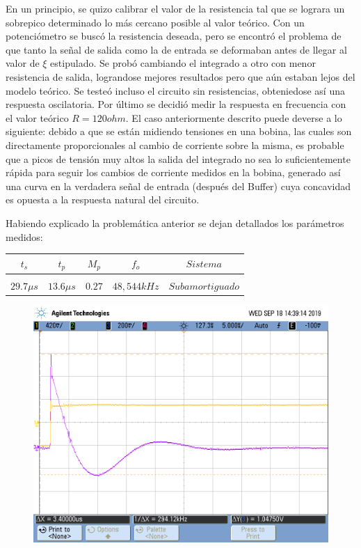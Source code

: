 En un principio, se quizo calibrar el valor de la resistencia tal que se lograra un sobrepico determinado lo más cercano posible al valor teórico. Con un potenciómetro se buscó la resistencia deseada, pero se encontró el problema de que tanto la señal de salida como la de entrada se deformaban antes de llegar al valor de $\xi$ estipulado. Se probó cambiando el integrado a otro con menor resistencia de salida, lograndose mejores resultados pero que aún estaban lejos del modelo teórico. Se testeó incluso el circuito sin resistencias, obteniedose así una respuesta oscilatoria. Por último se decidió medir la respuesta en frecuencia con el valor teórico $R = 120 ohm$. El caso anteriormente descrito puede deverse a lo siguiente: debido a que se están midiendo tensiones en una bobina, las cuales son directamente proporcionales al cambio de corriente sobre la misma, es probable que a picos de tensión muy altos la salida del integrado no sea lo suficientemente rápida para seguir los cambios de corriente medidos en la bobina, generado así una curva en la verdadera señal de entrada (después del Buffer) cuya concavidad es opuesta a la respuesta natural del circuito. 

Habiendo explicado la problemática anterior se dejan detallados los parámetros medidos:

\begin{table}[H]
    \centering
    \begin{tabular}{c c c c c}
        $t_s$ & $t_p$ & $M_p$ & $f_o$ & $Sistema$ \\
        \hline \\
        $29.7\mu s$ & $13.6 \mu s$ & $0.27$ & $48,544kHz$ & $Subamortiguado$ \\
        \hline
    \end{tabular}
    \label{tab:natural_pasaaltos}
\end{table}


\begin{figure}[H]
	\centering
	\includegraphics[scale=0.3]{../Mediciones/Osciloscopio/Pasaaltos_respuesta_escalon/scope_4.png}
\end{figure}


